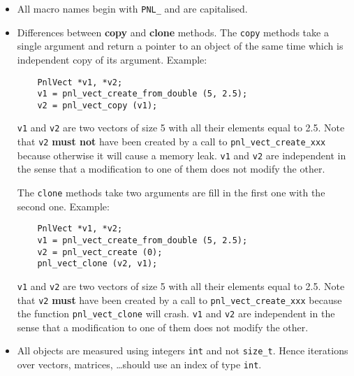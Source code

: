 \documentclass[a4paper,11pt,twoside]{article}
\begin{document}
\begin{itemize}
  \item All macro names begin with \verb!PNL_! and are capitalised.

  \item Differences between \textbf{copy} and \textbf{clone} methods.
    The \verb!copy! methods take a single argument and return a pointer to an object
    of the same time which is independent copy of its argument. 
    Example:
    \begin{verbatim}
    PnlVect *v1, *v2;
    v1 = pnl_vect_create_from_double (5, 2.5);
    v2 = pnl_vect_copy (v1);
    \end{verbatim}
    \verb!v1! and \verb!v2! are two vectors of size 5 with all their elements
    equal to 2.5. Note that \verb!v2! {\bf must not} have been created by a call
    to \verb!pnl_vect_create_xxx! because otherwise it will cause a memory leak.
    \verb!v1! and \verb!v2! are independent in the sense that a modification to
    one of them does not modify the other.

    The \verb!clone! methods take two arguments are fill in the first one with the
    second one. 
    Example:
    \begin{verbatim}
    PnlVect *v1, *v2;
    v1 = pnl_vect_create_from_double (5, 2.5);
    v2 = pnl_vect_create (0);
    pnl_vect_clone (v2, v1);
    \end{verbatim}
    \verb!v1! and \verb!v2! are two vectors of size 5 with all their elements
    equal to 2.5. Note that \verb!v2! {\bf must} have been created by a call to
    \verb!pnl_vect_create_xxx! because the function \verb!pnl_vect_clone!  will
    crash.  \verb!v1! and \verb!v2! are independent in the sense that a
    modification to one of them does not modify the other.


  \item All objects are measured using integers \verb!int! and not
    \verb!size_t!. Hence iterations over vectors, matrices, \dots should use an
    index of type \verb!int!.
\end{itemize}









\printindex
\end{document}
